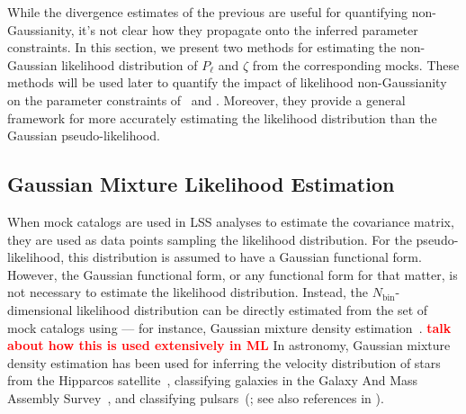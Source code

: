 \documentclass[12pt, letterpaper, preprint]{aastex}
\newcommand{\todo}[1]{{\bf \textcolor{red}{#1}}}
\newcommand{\Beut}{\citetalias{beutler2017}}
\newcommand{\Sinh}{\citetalias{sinha2017a}}
\begin{document}
While the divergence estimates of the previous are useful for 
quantifying non-Gaussianity, it's not clear how they propagate 
onto the inferred parameter constraints. In this section,
we present two methods for estimating the non-Gaussian likelihood 
distribution of $P_\ell$ and $\zeta$ from the corresponding mocks.
These methods will be used later to quantify the impact
of likelihood non-Gaussianity on the parameter constraints of 
\Beut~and \Sinh. Moreover, they provide a general framework for 
more accurately estimating the likelihood distribution than 
the Gaussian pseudo-likelihood. 

\subsection{Gaussian Mixture Likelihood Estimation}
When mock catalogs are used in LSS analyses to estimate the 
covariance matrix, they are used as data points sampling the 
likelihood distribution. For the pseudo-likelihood, 
this distribution is assumed to have a Gaussian functional form. 
However, the Gaussian functional form, or any functional form for 
that matter, is not necessary to estimate the likelihood distribution. 
Instead, the $N_\mathrm{bin}$-dimensional likelihood distribution 
can be directly estimated from the set of mock catalogs using --- for 
instance, Gaussian mixture density estimation~\citep{9780471006268}. 
\todo{talk about how this is used extensively in ML} 
In astronomy, Gaussian mixture density estimation has been used for 
inferring the velocity distribution of stars from the Hipparcos 
satellite~\citep{bovy2011}, classifying galaxies in the Galaxy And Mass Assembly 
Survey~\cite{taylor2015}, and classifying pulsars~(\cite{lee2012}; see
also references in \cite{kuhn2017}). 
\end{document}
